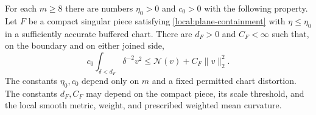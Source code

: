 \begin{lemma}\label{local:rough}
For each $m\ge8$ there are numbers $\eta_0>0$ and $c_0>0$ with the
following property.  Let $F$ be a compact singular piece satisfying \eqref{local:plane-containment}
with $\eta\le\eta_0$ in a sufficiently accurate buffered chart.
There are $d_F>0$ and $C_F<\infty$ such that, on the boundary and on
either joined side,
\begin{equation}\label{local:rough-estimate}
 c_0\int_{\delta<d_F}\delta^{-2}v^2
             \le\mathcal N(v)+C_F\|v\|_2^2.
\end{equation}
The constants $\eta_0,c_0$ depend only on $m$ and a fixed permitted
chart distortion.  The constants $d_F,C_F$ may depend on the compact
piece, its scale threshold, and the local smooth metric, weight,
and prescribed weighted mean curvature.
\end{lemma}
